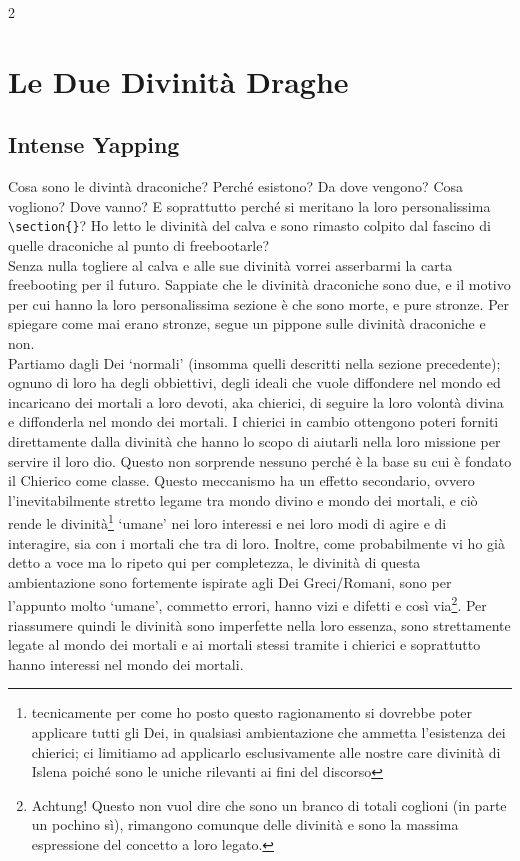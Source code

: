 \documentclass[10pt, a4paper]{report}
\begin{document}
\begin{multicols}{2}
\section{Le Due Divinità Draghe}
\subsection*{Intense Yapping}
Cosa sono le divintà draconiche? Perché esistono? Da dove vengono? Cosa vogliono? Dove vanno? E soprattutto perché si meritano la loro personalissima \verb|\section{}|?
Ho letto le divinità del calva e sono rimasto colpito dal fascino di quelle draconiche al punto di freebootarle? \\
Senza nulla togliere al calva e alle sue divinità vorrei asserbarmi la carta freebooting per il futuro. Sappiate che le divinità draconiche sono due, e il motivo per cui hanno la loro personalissima sezione è che sono morte, e pure stronze. Per spiegare come mai erano stronze, segue un pippone sulle divinità draconiche e non.\\
Partiamo dagli Dei \enquote*{normali} (insomma quelli descritti nella sezione precedente); ognuno di loro ha degli obbiettivi, degli ideali che vuole diffondere nel mondo ed incaricano dei mortali a loro devoti, aka chierici, di seguire la loro volontà divina e diffonderla nel mondo dei mortali. I chierici in cambio ottengono poteri forniti direttamente dalla divinità che hanno lo scopo di aiutarli nella loro missione per servire il loro dio. Questo non sorprende nessuno perché è la base su cui è fondato il Chierico come classe. Questo meccanismo ha un effetto secondario, ovvero l'inevitabilmente stretto legame tra mondo divino e mondo dei mortali, e ciò rende le divinità\footnote{tecnicamente per come ho posto questo ragionamento si dovrebbe poter applicare tutti gli Dei, in qualsiasi ambientazione che ammetta l'esistenza dei chierici; ci limitiamo ad applicarlo esclusivamente alle nostre care divinità di Islena poiché sono le uniche rilevanti ai fini del discorso} \enquote*{umane} nei loro interessi e nei loro modi di agire e di interagire, sia con i mortali che tra di loro. Inoltre, come probabilmente vi ho già detto a voce ma lo ripeto qui per completezza, le divinità di questa ambientazione sono fortemente ispirate agli Dei Greci/Romani, sono per l'appunto molto \enquote*{umane}, commetto errori, hanno vizi e difetti e così via\footnote{Achtung! Questo non vuol dire che sono un branco di totali coglioni (in parte un pochino sì), rimangono comunque delle divinità e sono la massima espressione del concetto a loro legato.}. Per riassumere quindi le divinità sono imperfette nella loro essenza, sono strettamente legate al mondo dei mortali e ai mortali stessi tramite i chierici e soprattutto hanno interessi nel mondo dei mortali. \\

\end{multicols}
\end{document}
